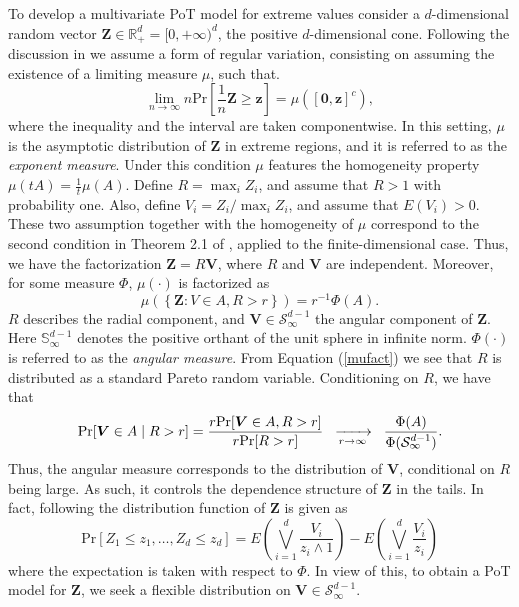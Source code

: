 To develop a multivariate PoT model for extreme values consider a $d$-dimensional random vector $\bm{Z} \in {\mathbb R}^d_+ = [0,+\infty)^d$, the positive $d$-dimensional cone. Following the discussion in \cite{goix2017} we assume a form of regular variation, consisting on assuming the existence of a limiting measure $\mu$, such that.
\[
    \lim\limits_{n\to\infty}n\text{Pr}\left[\frac{1}{n}\bm{Z}\geq \bm{z}\right] = \mu\left([\bm{0},\bm{z}]^c\right),
\]
where the inequality and the interval are taken componentwise. 
In this setting, $\mu$ is the asymptotic distribution of $\bm{Z}$ in extreme regions, and it is referred to as the
  \emph{exponent measure}. Under this condition $\mu$ features the homogeneity property $\mu(tA) = \frac{1}{t}\mu(A)$. 
Define  $R = \max_{i} Z_i$, and assume that $R>1$ with probability one. Also, define $V_i = Z_i/\max_i Z_i$, and assume that $E(V_i)>0$.
These two assumption together with the homogeneity of $\mu$ correspond to the second condition in Theorem 2.1 of
\cite{ferreira2014}, applied to the finite-dimensional case.
Thus, we have the factorization $\bm{Z} =  R\bm{V}$, where $R$ and $\bm{V}$  are independent. Moreover,
for some measure $\Phi$, $\mu(\cdot)$ is factorized as
\begin{equation}\label{mufact}
    \mu\left( \left\lbrace\bm{Z} : V \in A , R > r\right\rbrace \right) = r^{-1}\Phi(A).
\end{equation}
$R$ describes the radial component, and $\bm{V} \in \mathcal{S}_{\infty}^{d-1}$ the 
angular component of $\bm{Z}$.  Here ${\mathbb S}_\infty^{d-1}$ denotes the positive
orthant of the unit sphere in infinite norm.  $\Phi(\cdot)$ is referred to as the \emph{angular measure}.   
From Equation (\ref{mufact}) we see that $R$ is distributed as a standard Pareto random variable. Conditioning on $R$, we have that
\begin{equation} \label{MGP}
    \text{Pr}\left[\bm{V} \in A \mid R > r\right]
      = \frac{r\text{Pr}\left[\bm{V} \in A, R > r\right]}{r\text{Pr}[R > r]}\hspace{0.2cm}
      \xrightarrow[r\to\infty]{~} \hspace{0.2cm} \frac{\Phi(A)}{\Phi(\mathcal{S}_{\infty}^{d-1})}.
\end{equation}
 Thus, the angular measure corresponds to the distribution of $\bm{V}$, conditional on $R$ being large.
 As such, it controls the dependence structure of $\bm{Z}$ in the tails. In fact, following \cite{ferreira2014} the distribution function of $\bm{Z}$ is given as
\begin{equation*}
	\text{Pr}[Z_1\leq z_1, \ldots ,Z_d\leq z_d] = E\left(\bigvee_{i=1}^d
\frac{V_i}{z_i\wedge 1}\right) - E\left(\bigvee_{i=1}^d
\frac{V_i}{z_i}\right) 
\end{equation*}
where the expectation is taken with respect to $\Phi$.
In view of this, to obtain a PoT model for $\bm{Z}$, we seek 
a flexible distribution on $\bm{V} \in \mathcal{S}_{\infty}^{d-1}$.

